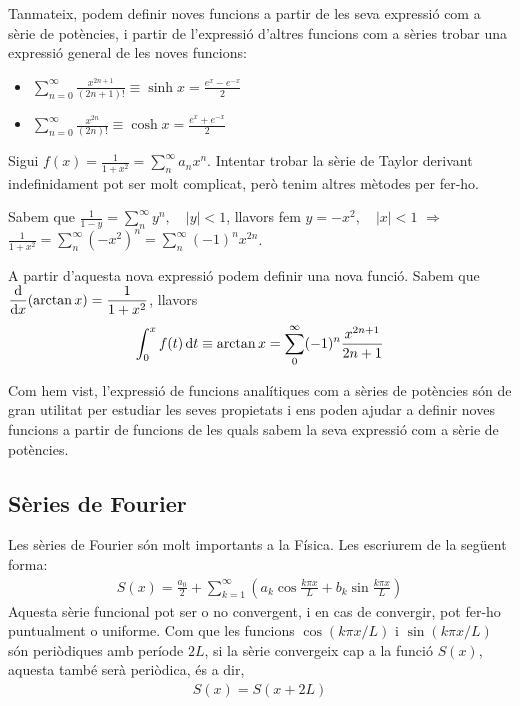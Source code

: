 Tanmateix, podem definir noves funcions a partir de les seva expressió com a sèrie de potències, i partir de l'expressió d'altres funcions com a sèries trobar una expressió general de les noves funcions:
\begin{itemize}
    \item $\displaystyle \sum\limits_{n=0}^{\infty}  \frac{x^{2n+1}}{(2n+1)!} \equiv \sinh x = \frac{e^{x} - e^{-x}}{2} $
    \item $\displaystyle \sum\limits_{n=0}^{\infty} \frac{x^{2n}}{(2n)!} \equiv \cosh x = \frac{e^{x} + e^{-x}}{2} $
\end{itemize}
\bigskip
\begin{example}
    Sigui $\displaystyle f(x) = \frac{1}{1 + x^{2}} = \sum\limits_{n}^{\infty} a_{n} x^{n}$. Intentar trobar la sèrie de Taylor derivant indefinidament pot ser molt complicat, però tenim altres mètodes per fer-ho.
    
    Sabem que $\displaystyle\frac{1}{1 - y} = \sum\limits_{n}^{\infty} y^{n}, \quad |y| < 1 $, llavors fem $y = -x^{2}, \quad |x| < 1$ $\Rightarrow$ $\displaystyle\frac{1}{1 + x^{2}} = \sum\limits_{n}^{\infty} (-x^{2})^{n} = \sum\limits_{n}^{\infty} (-1)^{n} x^{2n} $. 
    
    A partir d'aquesta nova expressió podem definir una nova funció. Sabem que $\displaystyle \frac{\mathrm{d}}{\mathrm{d} x} (\arctan x) = \frac{1}{1+x^{2}}$, llavors
    \begin{align}
        \int_{0}^{x} f(t) \mathop{}\!\mathrm{d} t \equiv \arctan x = \sum\limits_{0}^{\infty} (-1)^{n} \frac{x^{2n+1}}{2n+1}
    \end{align}
\end{example}
Com hem vist, l'expressió de funcions analítiques com a sèries de potències són de gran utilitat per estudiar les seves propietats i ens poden ajudar a definir noves funcions a partir de funcions de les quals sabem la seva expressió com a sèrie de potències.
\subsection{Sèries de Fourier}
Les sèries de Fourier són molt importants a la Física. Les escriurem de la següent forma:
\begin{align}
    S(x) = \frac{a_{0}}{2} + \sum\limits_{k=1}^{\infty} \left( a_{k} \cos \frac{k \pi x}{L} + b_{k} \sin \frac{k \pi x}{L} \right)
\end{align}
Aquesta sèrie funcional pot ser o no convergent, i en cas de convergir, pot fer-ho puntualment o uniforme. Com que les funcions $\cos (k \pi x / L)$ i $\sin (k \pi x / L)$ són periòdiques amb període $2L$, si la sèrie convergeix cap a la funció $S(x)$, aquesta també serà periòdica, és a dir,
\begin{align}
    S(x) = S(x + 2L)
\end{align}

